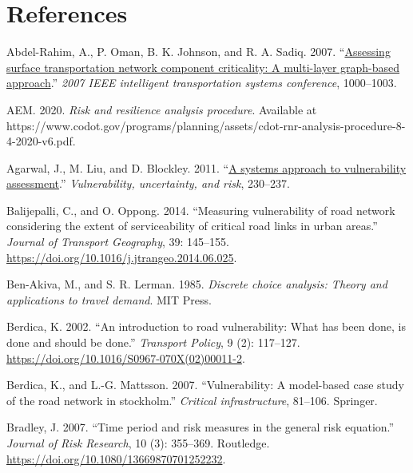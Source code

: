 \documentclass[]{ascelike-new}
\newlength{\cslhangindent}
\newenvironment{CSLReferences}[2] %
 {\begin{list}{}{%
  \setlength{\itemindent}{0pt}
  \setlength{\leftmargin}{0pt}
  \setlength{\parsep}{0pt}
  \ifodd #1
   \setlength{\leftmargin}{\cslhangindent}
   \setlength{\itemindent}{-1\cslhangindent}
  \fi
  \setlength{\itemsep}{#2\baselineskip}}}
 {\end{list}}
\begin{document}

\section*{References}\label{references}


\label{refs}
\begin{CSLReferences}{1}{0}
Abdel-Rahim, A., P. Oman, B. K. Johnson, and R. A. Sadiq. 2007.
{``\href{https://doi.org/10.1109/ITSC.2007.4357801}{Assessing surface
transportation network component criticality: A multi-layer graph-based
approach}.''} \emph{2007 IEEE intelligent transportation systems
conference}, 1000--1003.

AEM. 2020. \emph{Risk and resilience analysis procedure}. Available at
https://www.codot.gov/programs/planning/assets/cdot-rnr-analysis-procedure-8-4-2020-v6.pdf.

Agarwal, J., M. Liu, and D. Blockley. 2011.
{``\href{https://doi.org/10.1061/41170(400)28}{A systems approach to
vulnerability assessment}.''} \emph{Vulnerability, uncertainty, and
risk}, 230--237.

Balijepalli, C., and O. Oppong. 2014. {``Measuring vulnerability of road
network considering the extent of serviceability of critical road links
in urban areas.''} \emph{Journal of Transport Geography}, 39: 145--155.
\url{https://doi.org/10.1016/j.jtrangeo.2014.06.025}.

Ben-Akiva, M., and S. R. Lerman. 1985. \emph{Discrete choice analysis:
Theory and applications to travel demand}. MIT Press.

Berdica, K. 2002. {``An introduction to road vulnerability: What has
been done, is done and should be done.''} \emph{Transport Policy}, 9
(2): 117--127. \url{https://doi.org/10.1016/S0967-070X(02)00011-2}.

Berdica, K., and L.-G. Mattsson. 2007. {``Vulnerability: A model-based
case study of the road network in stockholm.''} \emph{Critical
infrastructure}, 81--106. Springer.

Bradley, J. 2007. {``Time period and risk measures in the general risk
equation.''} \emph{Journal of Risk Research}, 10 (3): 355--369.
Routledge. \url{https://doi.org/10.1080/13669870701252232}.


\end{CSLReferences}
\end{document}
